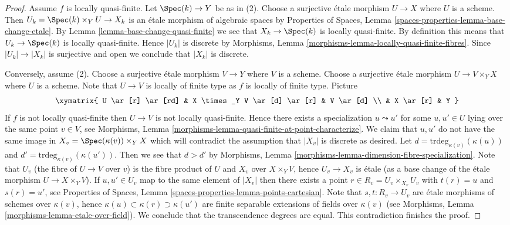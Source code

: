 \begin{proof}
Assume $f$ is locally quasi-finite. Let $\Spec(k) \to Y$ be as
in (2). Choose a surjective \'etale morphism $U \to X$ where $U$ is a scheme.
Then $U_k = \Spec(k) \times_Y U \to X_k$ is an
\'etale morphism of algebraic spaces by
Properties of Spaces, Lemma \ref{spaces-properties-lemma-base-change-etale}.
By
Lemma \ref{lemma-base-change-quasi-finite}
we see that $X_k \to \Spec(k)$ is locally quasi-finite. By
definition this means that $U_k \to \Spec(k)$ is locally
quasi-finite. Hence $|U_k|$ is discrete by
Morphisms, Lemma \ref{morphisms-lemma-locally-quasi-finite-fibres}.
Since $|U_k| \to |X_k|$ is surjective and open we conclude that $|X_k|$
is discrete.

\medskip\noindent
Conversely, assume (2). Choose a surjective \'etale morphism $V \to Y$
where $V$ is a scheme. Choose a surjective \'etale morphism
$U \to V \times_Y X$ where $U$ is a scheme.
Note that $U \to V$ is locally of finite type as $f$ is locally of finite type.
Picture
$$
\xymatrix{
U \ar[r] \ar[rd] & X \times_Y V \ar[d] \ar[r] & V \ar[d] \\
& X \ar[r] & Y
}
$$
If $f$ is not locally quasi-finite then $U \to V$ is not locally quasi-finite.
Hence there exists a specialization $u \leadsto u'$ for some $u, u' \in U$
lying over the same point $v \in V$, see
Morphisms, Lemma \ref{morphisms-lemma-quasi-finite-at-point-characterize}.
We claim that $u, u'$ do not have the same image in
$X_v = \Spec(\kappa(v)) \times_Y X$
which will contradict the assumption that $|X_v|$ is discrete as desired.
Let $d = \text{trdeg}_{\kappa(v)}(\kappa(u))$ and
$d' = \text{trdeg}_{\kappa(v)}(\kappa(u'))$.
Then we see that $d > d'$ by
Morphisms, Lemma \ref{morphisms-lemma-dimension-fibre-specialization}.
Note that $U_v$ (the fibre of $U \to V$ over $v$) is the fibre product of
$U$ and $X_v$ over $X \times_Y V$, hence $U_v \to X_v$ is \'etale (as a
base change of the \'etale morphism $U \to X \times_Y V$). If
$u, u' \in U_v$ map to the same element of $|X_v|$ then there exists a point
$r \in R_v = U_v \times_{X_v} U_v$ with $t(r) = u$ and $s(r) = u'$, see
Properties of Spaces, Lemma \ref{spaces-properties-lemma-points-cartesian}.
Note that $s, t : R_v \to U_v$ are \'etale morphisms of schemes
over $\kappa(v)$, hence $\kappa(u) \subset \kappa(r) \supset \kappa(u')$
are finite separable extensions of fields over $\kappa(v)$ (see
Morphisms, Lemma \ref{morphisms-lemma-etale-over-field}).
We conclude that the transcendence degrees are equal.
This contradiction finishes the proof.
\end{proof}

